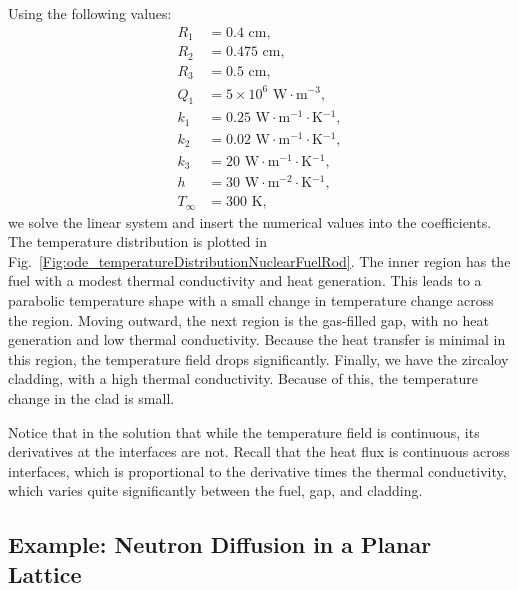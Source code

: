 Using the following values:
\begin{align}
  R_1 &= 0.4 \text{ cm}, \nonumber \\
  R_2 &= 0.475 \text{ cm}, \nonumber \\
  R_3 &= 0.5 \text{ cm}, \nonumber \\
  Q_1 &= 5 \times 10^6 \text{ W$\cdot$m$^{-3}$}, \nonumber \\
  k_1 &= 0.25 \text{ W$\cdot$m$^{-1}\cdot$K$^{-1}$}, \nonumber \\
  k_2 &= 0.02 \text{ W$\cdot$m$^{-1}\cdot$K$^{-1}$}, \nonumber \\
  k_3 &= 20 \text{ W$\cdot$m$^{-1}\cdot$K$^{-1}$}, \nonumber \\
  h   &= 30 \text{ W$\cdot$m$^{-2}\cdot$K$^{-1}$}, \nonumber  \\
  T_\infty &= 300 \text{ K}, \nonumber
\end{align}
we solve the linear system and insert the numerical values into the coefficients. The temperature distribution is plotted in Fig.~\ref{Fig:ode_temperatureDistributionNuclearFuelRod}. The inner region has the fuel with a modest thermal conductivity and heat generation. This leads to a parabolic temperature shape with a small change in temperature change across the region. Moving outward, the next region is the gas-filled gap, with no heat generation and low thermal conductivity. Because the heat transfer is minimal in this region, the temperature field drops significantly. Finally, we have the zircaloy cladding, with a high thermal conductivity. Because of this, the temperature change in the clad is small. 

Notice that in the solution that while the temperature field is continuous, its derivatives at the interfaces are not. Recall that the heat flux is continuous across interfaces, which is proportional to the derivative times the thermal conductivity, which varies quite significantly between the fuel, gap, and cladding.


\subsection{Example: Neutron Diffusion in a Planar Lattice}

